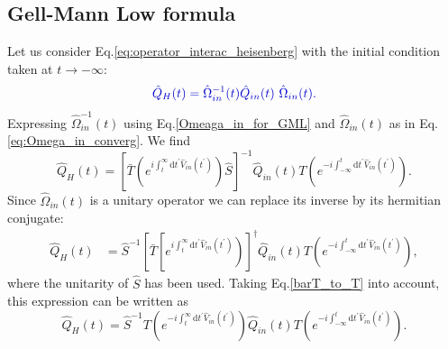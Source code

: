 \documentclass[12pt, titlepage]{article}
\begin{document}
\subsection{Gell-Mann Low formula}
Let us consider Eq.\enskip\eqref{eq:operator_interac_heisenberg} with the initial condition taken at $ t \rightarrow - \infty $:
\begin{equation}\textcolor[RGB]{0,0,204}{
\hat{Q}_{H}(t)=\hat{\Omega}_{in}^{-1}(t)\hat{Q}_{in}(t)\ \hat{\Omega}_{in}(t).
}
\end{equation}
Expressing $ \hat{\Omega}^{-1}_{in}(t) $ using Eq.\enskip\eqref{Omeaga_in_for_GML} and $ \hat{\Omega}_{in}(t) $ as in Eq.\enskip\eqref{eq:Omega_in_converg}. We find 
\begin{equation}
\hat{Q}_{H}(t)
=\left[ 
\bar{T}
\left( 
 e^{i\int_{t}^{\infty}\mathrm{d}t^{\prime} \hat{V}_{in}(t^{\prime})}
\right) 
\hat{S}
\right]^{-1}
\hat{Q}_{in}(t)
T
\left( 
 e^{-i\int_{-\infty}^{t}\mathrm{d}t^{\prime} \hat{V}_{in}(t^{\prime})}
\right) 
.
\end{equation}
Since $ \hat{\Omega}_{in}(t) $ is a unitary operator we can replace its inverse by its hermitian conjugate:
\begin{equation}
\begin{split}
\hat{Q}_{H}(t)
&=
\hat{S}^{-1}\left[ 
\bar{T}
\left[ 
 e^{i\int_{t}^{\infty}\mathrm{d}t^{\prime} \hat{V}_{in}(t^{\prime})}
\right) 
\right]^{\dagger}
\hat{Q}_{in}(t)
T
\left( 
 e^{-i\int_{-\infty}^{t}\mathrm{d}t^{\prime} \hat{V}_{in}(t^{\prime})}
\right) 
,
\end{split}
\end{equation}
where the unitarity of $ \hat{S} $ has been used.
Taking Eq.\enskip\eqref{barT_to_T} into account, this expression can be written as
\begin{equation}\label{1st_expression_for_Omega_H}
\hat{Q}_{H}(t)
=
\hat{S}^{-1} 
T
\left( 
 e^{-i\int_{t}^{\infty}\mathrm{d}t^{\prime} \hat{V}_{in}(t^{\prime})}
\right)
\hat{Q}_{in}(t)
T
\left( 
 e^{-i\int_{-\infty}^{t}\mathrm{d}t^{\prime} \hat{V}_{in}(t^{\prime})}
\right) .
\end{equation}
\end{document}
